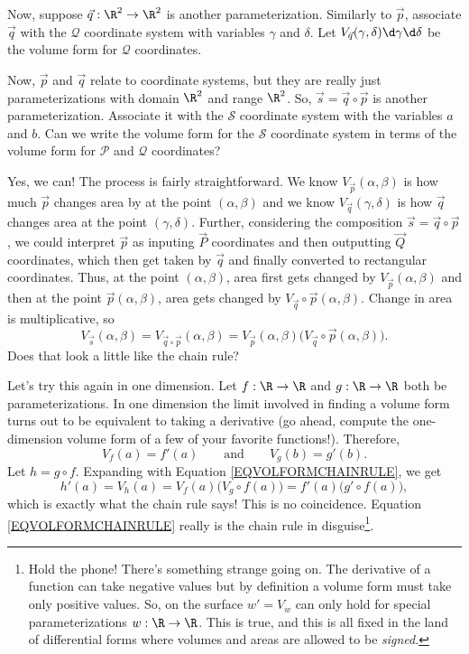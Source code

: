 Now, suppose $\vec q:\R^2\to\R^2$ is another parameterization.  Similarly to $\vec p$, associate
$\vec q$ with the $\mathcal Q$ coordinate system with variables $\gamma$ and $\delta$.  Let
$V_{\vec q}(\gamma,\delta)\d\gamma\d\delta$ be the volume form for $\mathcal Q$ coordinates.

Now, $\vec p$ and $\vec q$ relate to coordinate systems, but they are really just parameterizations with domain
$\R^2$ and range $\R^2$.  So, $\vec s=\vec q\circ \vec p$ is another parameterization.
Associate it with the $\mathcal S$ coordinate system with the variables $a$ and $b$.  Can we write the volume
form for the $\mathcal S$ coordinate system in terms of the volume form for $\mathcal P$ and
$\mathcal Q$ coordinates?

Yes, we can!  The process is fairly straightforward.  We know $V_{\vec p}(\alpha,\beta)$ is how
much $\vec p$ changes area by at the point $(\alpha,\beta)$ and we know $V_{\vec q}(\gamma,\delta)$
is how $\vec q$ changes area at the point $(\gamma,\delta)$.  Further, considering the composition
$\vec s=\vec q\circ \vec p$, we could interpret $\vec p$ as inputing $\vec P$ coordinates and then
outputting $\vec Q$ coordinates, which then get taken by $\vec q$ and finally converted to rectangular coordinates.
Thus, at the point $(\alpha,\beta)$, area first gets changed by $V_{\vec p}(\alpha,\beta)$
and then at the point $\vec p(\alpha,\beta)$, area gets changed by $V_{\vec q}\circ \vec p(\alpha,\beta)$.
Change in area is multiplicative, so
\begin{equation}
	\label{EQVOLFORMCHAINRULE}
	V_{\vec s}(\alpha,\beta)=
V_{\vec q\circ\vec p}(\alpha,\beta)
	= V_{\vec p}(\alpha,\beta)\Big(V_{\vec q}\circ \vec p(\alpha,\beta)\Big).
\end{equation}
Does that look a little like the chain rule?

Let's try this again in one dimension.  Let $f:\R\to\R$ and $g:\R\to\R$ both be parameterizations.
In one dimension the limit involved in finding a volume form turns out to be equivalent to taking
a derivative (go ahead, compute the one-dimension volume form of a few of your favorite functions!).
Therefore,
\[
	V_{f}(a) = f'(a)\qquad\text{and}\qquad V_{g}(b) = g'(b).
\]
Let $h=g\circ f$.  Expanding with Equation \eqref{EQVOLFORMCHAINRULE}, we get
\[
	h'(a) = V_{h}(a) = V_f(a)\Big(V_g\circ f(a)\Big) = f'(a)\Big(g'\circ f(a)\Big),
\]
which is exactly what the chain rule says!  This is no coincidence. Equation
\eqref{EQVOLFORMCHAINRULE} really is the chain rule in disguise\footnote{ 
Hold the phone!  There's something strange going on.  The derivative
of a function can take negative values but by definition a volume form must take only
positive values.  So, on the surface $w'=V_{w}$ can only hold for special parameterizations
$w:\R\to\R$.  This is true, and this is all fixed in the land of differential forms
where volumes and areas are allowed to be \emph{signed}.}.  

